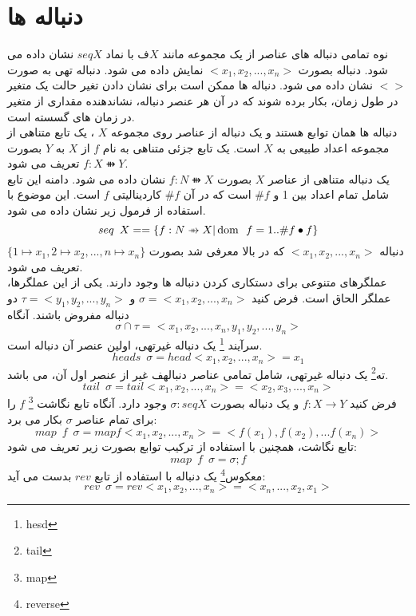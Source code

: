 \section{دنباله ها}
نوه تمامی دنباله های عناصر از یک مجموعه مانند $X$ف با نماد $seq X$ نشان داده می شود. دنباله بصورت 
$< x_1,x_2, ..., x_n>$
نمایش داده می شود. دنباله تهی به صورت $<>$ نشان داده می شود. دنباله ها ممکن است برای نشان دادن تغیر حالت یک متغیر در طول زمان، بکار برده شوند که در آن هر عنصر دنباله، نشاندهنده مقداری از متغیر در زمان های گسسته است.
\\
 دنباله ها همان توابع هستند  و یک دنباله از عناصر روی مجموعه $X$ ، یک تابع متناهی  از مجموعه اعداد طبیعی به $X$ است. یک تابع جزئی متناهی به نام $f$ از $X$ به $Y$ بصورت
 $f: X \ffun Y$
 تعریف می شود.
 \\
 یک دنباله متناهی از عناصر $X$ بصورت 
 $f: N \ffun X$
 نشان داده می شود. دامنه این تابع شامل تمام اعداد بین 1 و 
 $\#f$
  است که در آن 
 $\# f$
 کاردینالیتی $f$ است. این موضوع با استفاده از فرمول زیر نشان داده می شود.
 \[seq \enspace X==\{f:N \ffun X | \dom \enspace f=1 .. \#f \bullet f\}\]
 دنباله 
 $<x_1,x_2, ...,x_n>$
  که در بالا معرفی شد بصورت
$\{1\longmapsto x_1, 2\longmapsto x_2, ... , n\longmapsto x_n \}$  
  تعریف می شود.
  \\
  عملگرهای متنوعی برای دستکاری کردن دنباله ها وجود دارند. یکی از این عملگرها، عملگر الحاق است. فرض کنید 
  $\sigma = < x_1, x_2, ... , x_n>$
  و
  $\tau =<y_1, y_2, ..., y_n>$
  دو دنباله مفروض باشند. آنگاه
  \[\sigma \cap \tau = <x_1, x_2, ..., x_n, y_1, y_2, ..., y_n>\]
  سرآیند \footnote{hesd} یک دنباله غیرتهی، اولین عنصر آن دنباله است.
 \[heads \enspace \sigma =head <x_1, x_2, ..., x_n> = x_1\]
 ته\footnote{tail} یک دنباله غیرتهی، شامل تمامی عناصر دنبالهف غیر از عنصر اول آن، می باشد.
 \[tail \enspace \sigma = tail <x_1, x_2, ..., x_n> = <x_2, x_3, ..., x_n>\]
 فرض کنید
 $f: X \longrightarrow Y$
 و یک دنباله بصورت
 $\sigma : seq X$
 وجود دارد. آنگاه تابع نگاشت \footnote{map} $f$ را برای تمام عناصر $\sigma$ بکار می برد:
 \[ map \enspace f \enspace \sigma = map f <x_1, x_2, ..., x_n> = <f(x_1), f(x_2), ... f(x_n)>\]
 تابع نگاشت، همچنین با استفاده از ترکیب توابع بصورت زیر تعریف می شود:
 \[ map \enspace f \enspace \sigma = \sigma ; f\]
 معکوس\footnote{reverse} یک دنباله با استفاده از تابع $rev$ بدست می آید:
 \[rev \enspace \sigma = rev <x_1, x_2, ..., x_n> = <x_n, ..., x_2, x_1> \]
 

